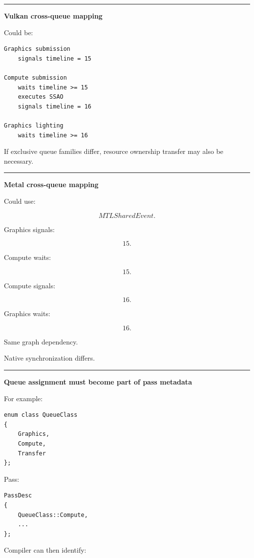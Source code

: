 \begin{center}\rule{0.5\linewidth}{0.5pt}\end{center}

\textbf{Vulkan cross-queue mapping}

Could be:

\begin{verbatim}
Graphics submission
    signals timeline = 15

Compute submission
    waits timeline >= 15
    executes SSAO
    signals timeline = 16

Graphics lighting
    waits timeline >= 16
\end{verbatim}

If exclusive queue families differ, resource ownership transfer may also be necessary.

\begin{center}\rule{0.5\linewidth}{0.5pt}\end{center}

\textbf{Metal cross-queue mapping}

Could use:

\[
MTLSharedEvent.
\]

Graphics signals:

\[
15.
\]

Compute waits:

\[
15.
\]

Compute signals:

\[
16.
\]

Graphics waits:

\[
16.
\]

Same graph dependency.

Native synchronization differs.

\begin{center}\rule{0.5\linewidth}{0.5pt}\end{center}

\textbf{Queue assignment must become part of pass metadata}

For example:

\begin{verbatim}
enum class QueueClass
{
    Graphics,
    Compute,
    Transfer
};
\end{verbatim}

Pass:

\begin{verbatim}
PassDesc
{
    QueueClass::Compute,
    ...
};
\end{verbatim}

Compiler can then identify:

